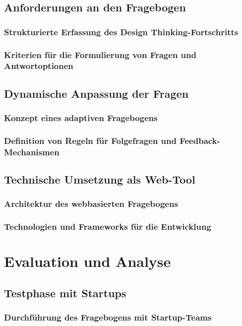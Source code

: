 \section{Anforderungen an den Fragebogen}
\subsection{Strukturierte Erfassung des Design Thinking-Fortschritts}
\subsection{Kriterien für die Formulierung von Fragen und Antwortoptionen}

\section{Dynamische Anpassung der Fragen}
\subsection{Konzept eines adaptiven Fragebogens}
\subsection{Definition von Regeln für Folgefragen und Feedback-Mechanismen}

\section{Technische Umsetzung als Web-Tool}
\subsection{Architektur des webbasierten Fragebogens}
\subsection{Technologien und Frameworks für die Entwicklung}

\chapter{Evaluation und Analyse}

\section{Testphase mit Startups}
\subsection{Durchführung des Fragebogens mit Startup-Teams}
